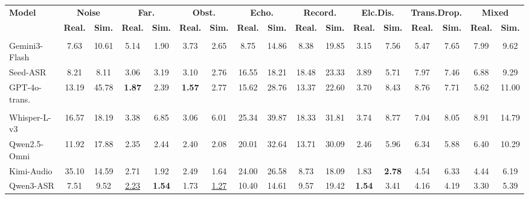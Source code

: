\documentclass{llmxive}
\begin{document}
\begin{table}[t]
\centering
\vspace{-1mm}
\label{tab:world_breakdown}
{\footnotesize
\setlength{\tabcolsep}{2pt}
\begin{tabular}{lcccccccccccccccc}
\toprule
\multirow{2}{*}{\textbf{Model}}
& \multicolumn{2}{c}{\textbf{Noise}}
& \multicolumn{2}{c}{\textbf{Far.}}
& \multicolumn{2}{c}{\textbf{Obst.}}
& \multicolumn{2}{c}{\textbf{Echo.}}
& \multicolumn{2}{c}{\textbf{Record.}}
& \multicolumn{2}{c}{\textbf{Elc.Dis.}}
& \multicolumn{2}{c}{\textbf{Trans.Drop.}}
& \multicolumn{2}{c}{\textbf{Mixed}} \\
\cmidrule(lr){2-3}
\cmidrule(lr){4-5}
\cmidrule(lr){6-7}
\cmidrule(lr){8-9}
\cmidrule(lr){10-11}
\cmidrule(lr){12-13}
\cmidrule(lr){14-15}
\cmidrule(lr){16-17}
& \textbf{Real.}
& \textbf{Sim.}
& \textbf{Real.}
& \textbf{Sim.}
& \textbf{Real.}
& \textbf{Sim.}
& \textbf{Real.}
& \textbf{Sim.}
& \textbf{Real.}
& \textbf{Sim.}
& \textbf{Real.}
& \textbf{Sim.}
& \textbf{Real.}
& \textbf{Sim.}
& \textbf{Real.}
& \textbf{Sim.} \\
\midrule
\rowcolor{headerblue}
\multicolumn{17}{l}{\textit{Closed-source models}} \\
Gemini3-Flash
& 7.63 & 10.61 & 5.14 & 1.90 & 3.73 & 2.65 & 8.75 & 14.86 & 8.38 & 19.85 & 3.15 & 7.56 & 5.47 & 7.65 & 7.99 & 9.62 \\
Seed-ASR
& 8.21 & 8.11 & 3.06 & 3.19 & 3.10 & 2.76 & 16.55 & 18.21 & 18.48 & 23.33 & 3.89 & 5.71 & 7.97 & 7.46 & 6.88 & 9.29 \\
GPT-4o-trans.
& 13.19 & 45.78 & \textbf{1.87} & 2.39 & \textbf{1.57} & 2.77 & 15.62 & 28.76 & 13.37 & 22.60 & 3.70 & 8.43 & 8.76 & 7.71 & 5.62 & 11.00 \\
\rowcolor{headerblue}
\multicolumn{17}{l}{\textit{Open-source models}} \\
Whisper-L-v3
& 16.57 & 18.19 & 3.38 & 6.85 & 3.06 & 6.01 & 25.34 & 39.87 & 18.33 & 31.81 & 3.74 & 8.77 & 7.04 & 8.05 & 8.91 & 14.79 \\
Qwen2.5-Omni
& 11.92 & 17.88 & 2.35 & 2.44 & 2.40 & 2.08 & 20.01 & 32.64 & 13.71 & 30.09 & 2.46 & 5.96 & 6.34 & 5.88 & 6.40 & 10.29 \\
Kimi-Audio
& 35.10 & 14.59 & 2.71 & 1.92 & 2.49 & 1.64 & 24.00 & 26.58 & 8.73 & 18.09 & 1.83 & \textbf{2.78} & 4.54 & 6.33 & 4.44 & 6.19 \\
Qwen3-ASR
& 7.51 & 9.52 & \underline{2.23} & \textbf{1.54} & 1.73 & \underline{1.27} & 10.40 & 14.61 & 9.57 & 19.42 & \textbf{1.54} & 3.41 & 4.16 & 4.19 & 3.30 & 5.39 \\

\end{tabular}}
\end{table}
\end{document}
